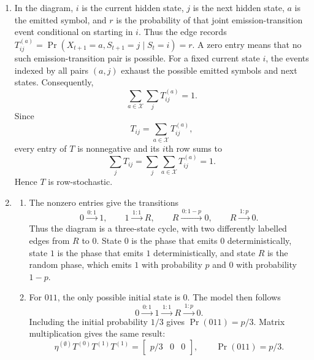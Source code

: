 \begin{solution}[ex:p3-1]
    \begin{enumerate}
      \item In the diagram, $i$ is the current hidden state, $j$ is the next
        hidden state, $a$ is the emitted symbol, and $r$ is the probability of
        that joint emission-transition event conditional on starting in $i$.
        Thus the edge records
        $T^{(a)}_{ij}=\Pr(X_{t+1}=a,S_{t+1}=j\mid S_t=i)=r$.
        A zero entry means that no such emission-transition pair is possible.
        For a fixed current state $i$, the events indexed by all pairs $(a,j)$
        exhaust the possible emitted symbols and next states. Consequently,
        \[
          \sum_{a\in\mathcal X}\sum_j T^{(a)}_{ij}=1.
        \]
        Since
        \[
          T_{ij}=\sum_{a\in\mathcal X}T^{(a)}_{ij},
        \]
        every entry of $T$ is nonnegative and its $i$th row sums to
        \[
          \sum_jT_{ij}
            =\sum_j\sum_{a\in\mathcal X}T^{(a)}_{ij}=1.
        \]
        Hence $T$ is row-stochastic.

      \item
        \begin{enumerate}
          \item The nonzero entries give the transitions
            \[
              0\xrightarrow{\,0:1\,}1,
              \qquad
              1\xrightarrow{\,1:1\,}R,
              \qquad
              R\xrightarrow{\,0:1-p\,}0,
              \qquad
              R\xrightarrow{\,1:p\,}0.
            \]
            Thus the diagram is a three-state cycle, with two differently
            labelled edges from $R$ to $0$. State $0$ is the phase that emits
            $0$ deterministically, state $1$ is the phase that emits $1$
            deterministically, and state $R$ is the random phase, which emits
            $1$ with probability $p$ and $0$ with probability $1-p$.

          \item For $011$, the only possible initial state is $0$. The model
            then follows
            \[
              0\xrightarrow{\,0:1\,}1
               \xrightarrow{\,1:1\,}R
               \xrightarrow{\,1:p\,}0.
            \]
            Including the initial probability $1/3$ gives
            $\Pr(011)=p/3$. Matrix multiplication gives the same result:
            \[
              \eta^{(\emptyset)}T^{(0)}T^{(1)}T^{(1)}
                =\begin{bmatrix}p/3&0&0\end{bmatrix},
              \qquad
              \Pr(011)=p/3.
            \]


\end{enumerate}
\end{enumerate}
\end{solution}
